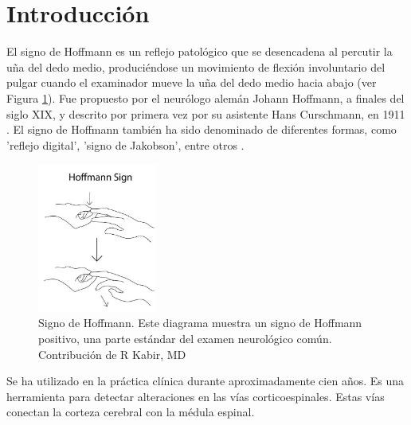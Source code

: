 \section{Introducción}
El signo de Hoffmann es un reflejo patológico que se desencadena al percutir la uña del dedo medio, produciéndose un movimiento de flexión involuntario del pulgar cuando el examinador mueve la uña del dedo medio hacia abajo (ver Figura \ref{fig:Hoffmann_sign}). Fue propuesto por el neurólogo alemán Johann Hoffmann, a finales del siglo XIX, y descrito por primera vez por su asistente Hans Curschmann, en 1911 \cite{BENDHEIM}. El signo de Hoffmann también ha sido denominado de diferentes formas, como 'reflejo digital', 'signo de Jakobson', entre otros \cite{glaser2001cervical}.

\begin{figure}[h!]
	\includegraphics[width=0.35\textwidth]{figures/Kabir_Hoffmann__Sign.jpg}
	\caption{Signo de Hoffmann. Este diagrama muestra un signo de Hoffmann positivo, una parte estándar del examen neurológico común. Contribución de R Kabir, MD\cite{whitney}}
	\label{fig:Hoffmann_sign}
\end{figure}

Se ha utilizado en la práctica clínica durante aproximadamente cien años. Es una herramienta para detectar alteraciones en las vías corticoespinales. Estas vías conectan la corteza cerebral con la médula espinal.\cite{BENDHEIM} \par

